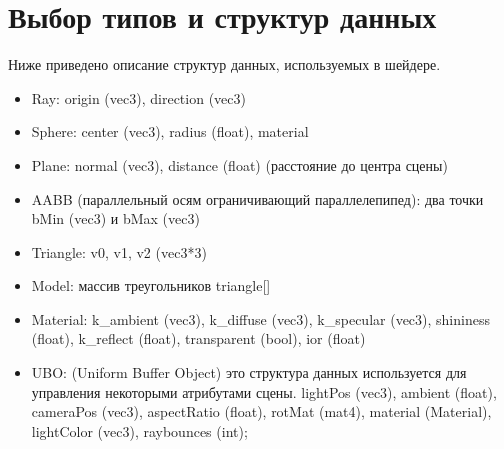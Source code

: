 \section{Выбор типов и структур данных}

Ниже приведено описание структур данных, используемых в шейдере.

\begin{itemize}
    \item Ray: origin (vec3), direction (vec3)
    \item Sphere: center (vec3), radius (float), material
    \item Plane: normal (vec3), distance (float) (расстояние до центра сцены)
    \item AABB (параллельный осям ограничивающий параллелепипед): два точки bMin (vec3) и bMax (vec3)
    \item Triangle: v0, v1, v2 (vec3*3)
    \item Model: массив треугольников triangle[]
    \item Material: k\_ambient (vec3), k\_diffuse (vec3), k\_specular (vec3), shininess (float),
    k\_reflect (float), transparent (bool), ior (float)
    \item UBO: (Uniform Buffer Object) это структура данных используется для управления некоторыми атрибутами сцены.
    lightPos (vec3), ambient (float), cameraPos (vec3), aspectRatio (float), rotMat (mat4), material (Material), lightColor (vec3), raybounces (int);
\end{itemize}

